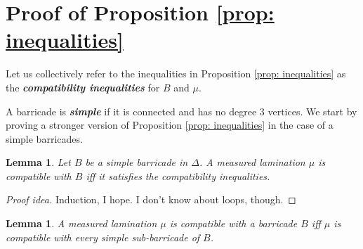 \documentclass{amsart}
\newtheorem{lemma}[proposition]{Lemma}
\newtheorem{thm}[proposition]{Theorem}
\theoremstyle{definition}
\theoremstyle{remark}
\numberwithin{equation}{section}
\newcommand{\newword}[1]{\textbf{\emph{#1}}}
\newcommand{\0}{{\mathbf{0}}}
\newcommand{\M}{\mathcal{M}}
\renewcommand{\S}{\mathbf{S}}
\newenvironment{ex}{\refstepcounter{proposition}\begin{proof}[Example \emph{\thethm}]\renewcommand*{\qedsymbol}{\(\blacksquare\)}}{\end{proof}}
\begin{document}

%
%
%	
%


\section{Proof of Proposition \ref{prop: inequalities}}

Let us collectively refer to the inequalities in Proposition \ref{prop: inequalities} as the \newword{compatibility inequalities} for $B$ and $\mu$. 

A barricade is \newword{simple} if it is connected and has no degree $3$ vertices. We start by proving a stronger version of Proposition \ref{prop: inequalities} in the case of a simple barricades.

\begin{lemma}\label{lemma: simplebarricade}
Let $B$ be a simple barricade in $\Delta$. A measured lamination $\mu$ is compatible with $B$ iff it satisfies the compatibility inequalities.
\end{lemma}

\begin{proof}[Proof idea]
Induction, I hope. I don't know about loops, though.
\end{proof}
	
\begin{lemma}\label{lemma: simplesub}
A measured lamination $\mu$ is compatible with a barricade $B$ iff $\mu$ is compatible with every simple sub-barricade of $B$.
\end{lemma}
\end{document}
